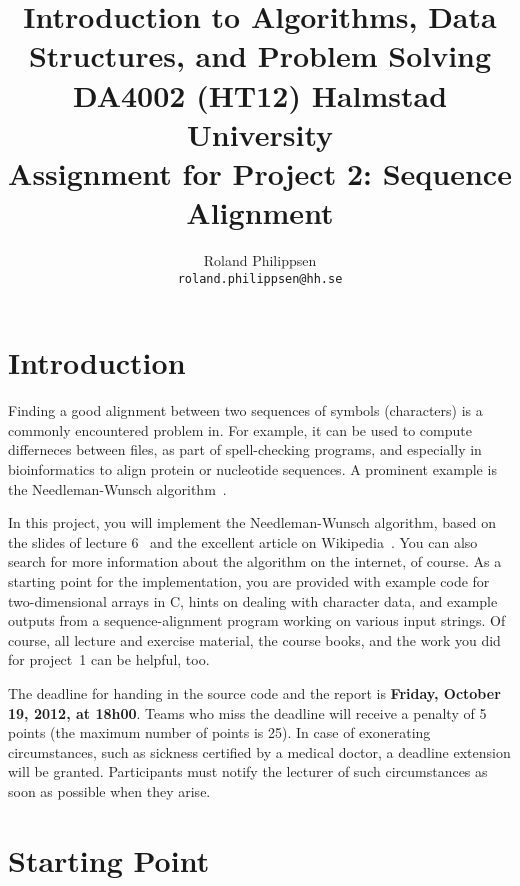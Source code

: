 \documentclass[a4paper,10pt]{article}
\begin{document}
\title{
  {\normalsize
    Introduction to Algorithms, Data Structures, and Problem Solving\\
    DA4002 (HT12) Halmstad University}\\
  Assignment for Project 2: Sequence Alignment\\
}
\author{
  Roland Philippsen\\
  \texttt{roland.philippsen@hh.se}
}
\maketitle



\section{Introduction}

Finding a good alignment between two sequences of symbols (characters) is a commonly encountered problem in.
For example, it can be used to compute differneces between files, as part of spell-checking programs, and especially in bioinformatics to align protein or nucleotide sequences.
A prominent example is the Needleman-Wunsch algorithm~\cite{needleman-wunsch:1970}.

In this project, you will implement the Needleman-Wunsch algorithm, based on the slides of lecture 6~\cite{lecture6} and the excellent article on Wikipedia~\cite{wikipedia:needleman-wunsch}.
You can also search for more information about the algorithm on the internet, of course.
As a starting point for the implementation, you are provided with example code for two-dimensional arrays in C, hints on dealing with character data, and example outputs from a sequence-alignment program working on various input strings.
Of course, all lecture and exercise material, the course books, and the work you did for project~1 can be helpful, too.

The deadline for handing in the source code and the report is \textbf{Friday, October 19, 2012, at 18h00}.
Teams who miss the deadline will receive a penalty of 5 points (the maximum number of points is 25).
In case of exonerating circumstances, such as sickness certified by a medical doctor, a deadline extension will be granted.
Participants must notify the lecturer of such circumstances as soon as possible when they arise.



\section{Starting Point}
\end{document}
